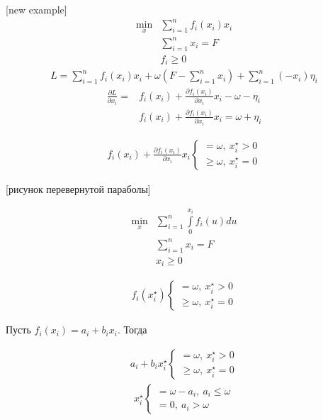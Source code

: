 \documentclass[12pt,a4paper,titlepage,oneside]{book}
\theoremstyle{definition}
\theoremstyle{plain}
\theoremstyle{remark}
\theoremstyle{remark}
\theoremstyle{plain}
\theoremstyle{plain}
\begin{document}
[new example]
\begin{align*}
\min\limits_x &\sum\limits_{i=1}^n f_i(x_i)x_i\\
&\sum\limits_{i=1}^n x_i = F \\
&f_i \geq 0
\end{align*}
\begin{align*}
L = \sum\limits_{i=1}^n f_i(x_i)x_i + \omega(F - \sum\limits_{i=1}^n x_i) + \sum\limits_{i=1}^n (-x_i)\eta_i
\end{align*}
\begin{align*}
\frac{\partial L}{\partial x_i} = &f_i(x_i) + \frac{\partial f_i(x_i)}{\partial x_i}x_i - \omega -\eta_i\\
&f_i(x_i) + \frac{\partial f_i(x_i)}{\partial x_i}x_i = \omega + \eta_i
\end{align*}

\begin{align*}
f_i(x_i) + \frac{\partial f_i(x_i)}{\partial x_i}x_i  \begin{cases} = \omega, \: x_i^\star > 0\\
\geq \omega, \: x_i^\star = 0
\end{cases}
\end{align*}

[рисунок перевернутой параболы]


\begin{align*}
\min\limits_x &\sum\limits_{i=1}^n \int\limits_0^{x_i} f_i(u)du\\
&\sum\limits_{i=1}^n x_i = F \\
&x_i \geq 0
\end{align*}

\begin{align*}
f_i(x_i^\star)  \begin{cases} = \omega, \: x_i^\star > 0\\
\geq \omega, \: x_i^\star = 0
\end{cases}
\end{align*}

Пусть $f_i(x_i) = a_i + b_i x_i$. Тогда

\begin{align*}
a_i + b_i x_i^\star \begin{cases} = \omega, \: x_i^\star > 0\\
\geq \omega, \: x_i^\star = 0
\end{cases}
\end{align*}
\begin{align*}
x_i^\star  \begin{cases} = \omega - a_i, \: a_i \leq \omega\\
= 0, \:a_i>\omega
\end{cases}
\end{align*}
\end{document}
